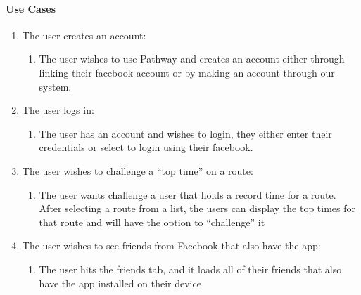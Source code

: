﻿\documentclass{article}
\begin{document}
\paragraph{Use Cases}
\begin{enumerate}
\item The user creates an account:
    \begin{enumerate}
    \item The user wishes to use Pathway and creates an account either through linking their facebook account or by making an account through our system.
    \end{enumerate}
\item The user logs in:
    \begin{enumerate}
    \item The user has an account and wishes to login, they either enter their credentials or select to login using their facebook.
    \end{enumerate}
\item The user wishes to challenge a “top time” on a route:
    \begin{enumerate}
    \item The user wants challenge a user that holds a record time for a route. After selecting a route from a list, the users can display the top times for that route and will have the option to “challenge” it
    \end{enumerate}
\item The user wishes to see friends from Facebook that also have the app:
    \begin{enumerate}
    \item The user hits the friends tab, and it loads all of their friends that also have the app installed on their device
    \end{enumerate}
\end{enumerate}
\pagebreak
\end{document}
